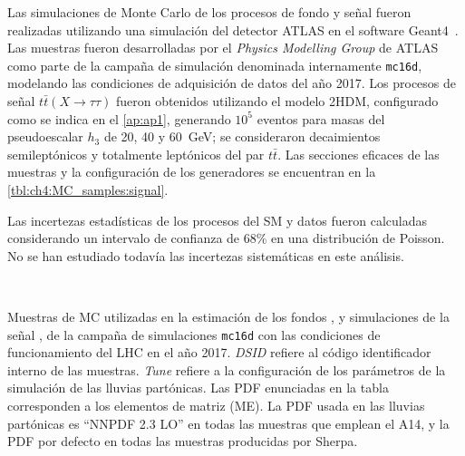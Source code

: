 Las simulaciones de Monte Carlo de los procesos de fondo y señal fueron realizadas utilizando una simulación del detector ATLAS en el software Geant4~\cite{TheATLASCollaboration2010}. Las muestras fueron desarrolladas por el \textit{Physics Modelling Group} de ATLAS como parte de la campaña de simulación denominada internamente \texttt{mc16d}, modelando las condiciones de adquisición de datos del año 2017. Los procesos de señal $t\bar{t}(X\to\tau\tau)$ fueron obtenidos utilizando el modelo 2HDM, configurado como se indica en el \cref{ap:ap1}, generando $10^5$ eventos para masas del pseudoescalar $h_3$ de \num{20}, \num{40} y \SI{60}{\GeV}; se consideraron decaimientos semileptónicos y totalmente leptónicos del par $t\bar{t}$. Las secciones eficaces de las muestras y la configuración de los generadores se encuentran en la \cref{tbl:ch4:MC_samples:signal}.

Las incertezas estadísticas de los procesos del SM y datos fueron calculadas considerando un intervalo de confianza de 68\% en una distribución de Poisson. No se han estudiado todavía las incertezas sistemáticas en este análisis.

\begin{table}
    \vspace{18.5em}
    \\

    \vspace{1em}

    
    \vspace{1em}

    \caption{Muestras de MC utilizadas en la estimación de los fondos , y simulaciones de la señal , de la campaña de simulaciones \texttt{mc16d} con las condiciones de funcionamiento del LHC en el año 2017. \textit{DSID} refiere al código identificador interno de las muestras. \textit{Tune} refiere a la configuración de los parámetros de la simulación de las lluvias partónicas. Las PDF enunciadas en la tabla corresponden a los elementos de matriz (ME). La PDF usada en las lluvias partónicas es ``NNPDF 2.3 LO'' en todas las muestras que emplean el  A14, y la PDF por defecto en todas las muestras producidas por Sherpa.}
    \label{tbl:ch4:MC_samples}
\end{table}

